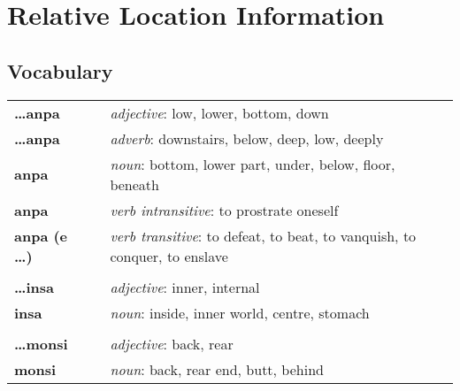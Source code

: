 %
\section{Relative Location Information}
%
%
\subsection*{Vocabulary}
%
\begin{supertabular}{p{2,5cm}|ll}
    \textbf{\dots anpa}     &  & \textit{adjective}: low, lower, bottom, down                                      \\ %
    \textbf{\dots anpa}     &  & \textit{adverb}: downstairs, below, deep, low, deeply                             \\ %
    \textbf{anpa}           &  & \textit{noun}: bottom, lower part, under, below, floor, beneath                   \\ %
    \textbf{anpa}           &  & \textit{verb intransitive}: to prostrate oneself                                  \\ %
    \textbf{anpa (e \dots)} &  & \textit{verb transitive}: to defeat, to beat, to vanquish, to conquer, to enslave \\ %
                            &  &                                                                                   \\ %
    \textbf{\dots insa}     &  & \textit{adjective}: inner, internal                                               \\ %
    \textbf{insa}           &  & \textit{noun}: inside, inner world, centre, stomach                               \\ %
                            &  &                                                                                   \\ %
    \textbf{\dots monsi}    &  & \textit{adjective}: back, rear                                                    \\ %
    \textbf{monsi}          &  & \textit{noun}: back, rear end, butt, behind                                       \\ %

\end{supertabular}
